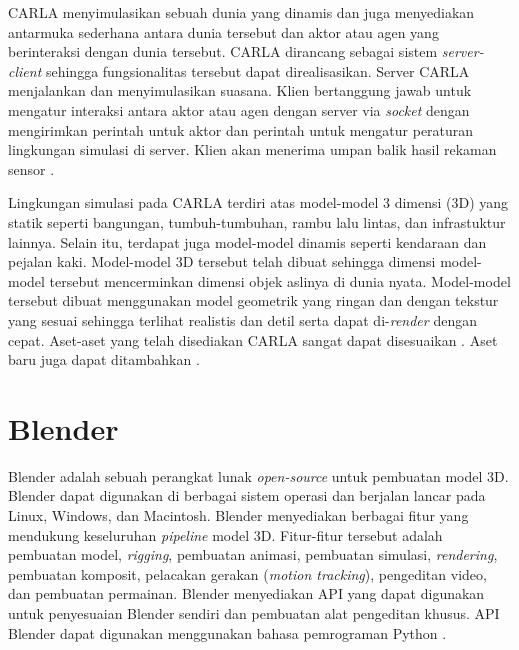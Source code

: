 CARLA menyimulasikan sebuah dunia yang dinamis dan juga menyediakan antarmuka
sederhana antara dunia tersebut dan aktor atau agen yang berinteraksi dengan
dunia tersebut. CARLA dirancang sebagai sistem \textit{server-client} sehingga
fungsionalitas tersebut dapat direalisasikan. Server CARLA menjalankan dan
menyimulasikan suasana. Klien bertanggung jawab untuk mengatur interaksi antara
aktor atau agen dengan server via \textit{socket} dengan mengirimkan perintah
untuk aktor dan perintah untuk mengatur peraturan lingkungan simulasi di server.
Klien akan menerima umpan balik hasil rekaman sensor
\parencite{carla-dosovitskiy}.

Lingkungan simulasi pada CARLA terdiri atas model-model 3 dimensi (3D) yang
statik seperti bangungan, tumbuh-tumbuhan, rambu lalu lintas, dan infrastuktur
lainnya. Selain itu, terdapat juga model-model dinamis seperti kendaraan dan
pejalan kaki. Model-model 3D tersebut telah dibuat sehingga dimensi model-model
tersebut mencerminkan dimensi objek aslinya di dunia nyata. Model-model tersebut
dibuat menggunakan model geometrik yang ringan dan dengan tekstur yang sesuai
sehingga terlihat realistis dan detil serta dapat di-\textit{render} dengan
cepat. Aset-aset yang telah disediakan CARLA sangat dapat disesuaikan
\parencite{carla-dosovitskiy}. Aset baru juga dapat ditambahkan
\parencite{carla-documentation-intro}.


\section{Blender}
Blender adalah sebuah perangkat lunak \textit{open-source} untuk pembuatan model
3D. Blender dapat digunakan di berbagai sistem operasi dan berjalan lancar pada
Linux, Windows, dan Macintosh. Blender menyediakan berbagai fitur yang mendukung
keseluruhan \textit{pipeline} model 3D. Fitur-fitur tersebut adalah pembuatan
model, \textit{rigging}, pembuatan animasi, pembuatan simulasi,
\textit{rendering}, pembuatan komposit, pelacakan gerakan (\textit{motion
tracking}), pengeditan video, dan pembuatan permainan. Blender menyediakan API
yang dapat digunakan untuk penyesuaian Blender sendiri dan pembuatan alat
pengeditan khusus. API Blender dapat digunakan menggunakan bahasa pemrograman
Python \parencite{blender-about}.

